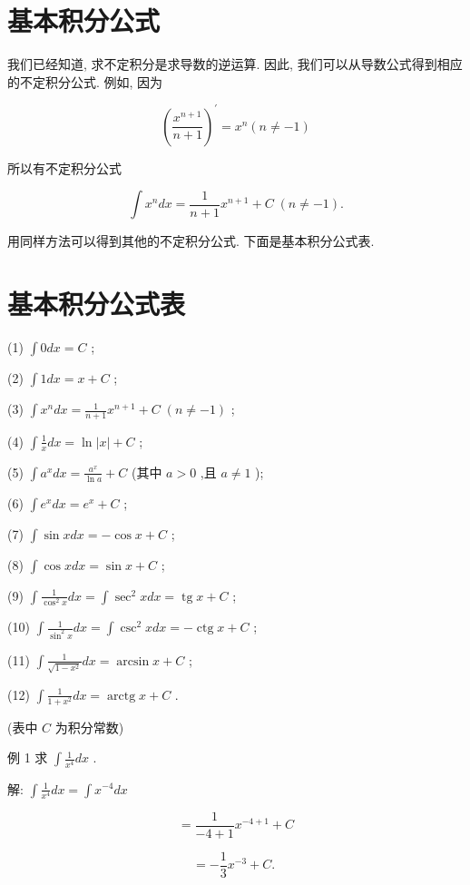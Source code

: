 \documentclass[lang=cn,newtx,10pt,scheme=chinese]{elegantbook}
\begin{document}
\section{基本积分公式}

我们已经知道, 求不定积分是求导数的逆运算. 因此, 我们可以从导数公式得到相应的不定积分公式. 例如, 因为

\[
{\left( \frac{{x}^{n + 1}}{n + 1}\right) }^{\prime } = {x}^{n}\left( {n \neq - 1}\right)
\]

所以有不定积分公式

\[
\int {x}^{n}{dx} = \frac{1}{n + 1}{x}^{n + 1} + C\;\left( {n \neq - 1}\right) .
\]

用同样方法可以得到其他的不定积分公式. 下面是基本积分公式表.

\section*{基本积分公式表}

(1) \(\int {0dx} = C\) ;

(2) \(\int {1dx} = x + C\) ;

(3) \(\int {x}^{n}{dx} = \frac{1}{n + 1}{x}^{n + 1} + C\;\left( {n \neq - 1}\right)\) ;

(4) \(\int \frac{1}{x}{dx} = \ln \left| x\right| + C\) ;

(5) \(\int {a}^{x}{dx} = \frac{{a}^{x}}{\ln a} + C\) (其中 \(a > 0\) ,且 \(a \neq 1\) );

(6) \(\int {e}^{x}{dx} = {e}^{x} + C\) ;

(7) \(\int \sin {xdx} = - \cos x + C\) ;

(8) \(\int \cos {xdx} = \sin x + C\) ;

(9) \(\int \frac{1}{{\cos }^{2}x}{dx} = \int {\sec }^{2}{xdx} = \operatorname{tg}x + C\) ;

(10) \(\int \frac{1}{{\sin }^{2}x}{dx} = \int {\csc }^{2}{xdx} = - \operatorname{ctg}x + C\) ;

(11) \(\int \frac{1}{\sqrt{1 - {x}^{2}}}{dx} = \arcsin x + C\) ;

(12) \(\int \frac{1}{1 + {x}^{2}}{dx} = \operatorname{arctg}x + C\) .

(表中 \(C\) 为积分常数)

例 1 求 \(\int \frac{1}{{x}^{4}}{dx}\) .

解: \(\int \frac{1}{{x}^{4}}{dx} = \int {x}^{-4}{dx}\)

\[
= \frac{1}{-4 + 1}{x}^{-4 + 1} + C
\]

\[
= - \frac{1}{3}{x}^{-3} + C\text{. }
\]
\end{document}
